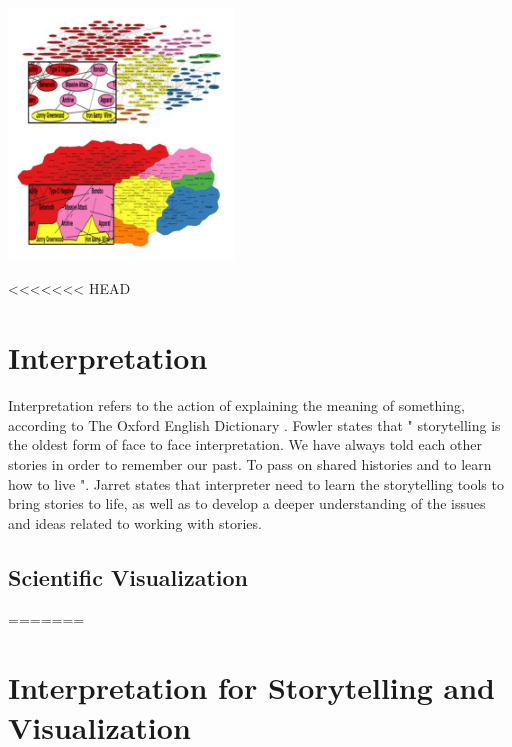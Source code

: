\documentclass{egpubl}
\begin{document}
\begingroup
\centering
\includegraphics[width=6cm]{./images/saket2015}
\label{fig:saket2015}
\endgroup




<<<<<<< HEAD
\section{Interpretation}
Interpretation refers to the action of explaining the meaning of something, according to The Oxford English Dictionary \cite{Interpretation}. Fowler \cite{fowler2003ancient} states that " storytelling is the oldest form of face to face interpretation. We have always told each other stories in order to remember our past. To pass on shared histories and to learn how to live ". Jarret \cite{jarret2006storytelling} states that interpreter need to learn the storytelling tools to bring stories to life, as well as to develop a deeper understanding of the issues and ideas related to working with stories. 
\subsection{Scientific Visualization}
=======
\section{Interpretation for Storytelling and Visualization}
\end{document}
